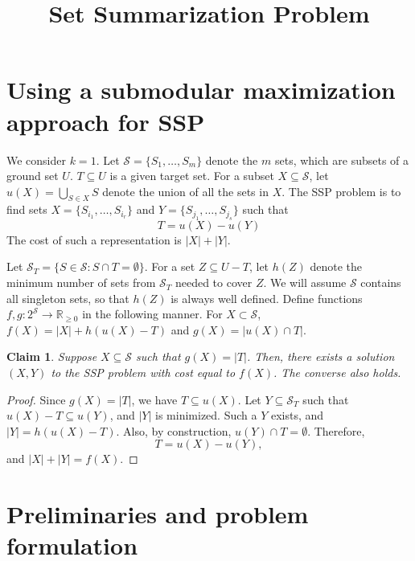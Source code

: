 \documentclass[twoside, leqno, twocolumn]{article}
\title{Set Summarization Problem}
\newtheorem{claim}[lemma]{Claim} %
\begin{document}
%










\section{Using a submodular maximization approach for SSP}
We consider $k=1$.
Let $\mathcal{S} = \{S_1,\ldots,S_m\}$ denote the $m$ sets, which are subsets of
a ground set $U$. $T\subseteq U$ is a given target set.  For a subset
$X\subseteq \mathcal{S}$, let $u(X)=\bigcup_{S\in X} S$ denote the union of all the
sets in $X$.  The SSP problem is to
find sets $X=\{S_{i_1},\ldots,S_{i_r}\}$ and $Y=\{S_{j_1},\ldots,S_{j_s}\}$ such that
\[
T= u(X) - u(Y)
\]
The cost of such a representation is $|X|+|Y|$.

Let $\mathcal{S}_T=\{S\in\mathcal{S}: S\cap T=\emptyset\}$.
For a set $Z\subseteq U-T$, let $h(Z)$ denote the minimum number of sets from $\mathcal{S}_T$
needed to cover $Z$. We will assume $\mathcal{S}$ contains all singleton sets, so that
$h(Z)$ is always well defined.
Define functions $f,g:2^{\mathcal{S}}\rightarrow \mathbb{R}_{\geq 0}$ in the following manner.
For $X\subset \mathcal{S}$, $f(X)=|X| + h(u(X)-T)$ and $g(X)=|u(X)\cap T|$.

\begin{claim}
Suppose $X\subseteq\mathcal{S}$ such that $g(X)=|T|$. Then, there exists a solution $(X, Y)$
to the SSP problem with cost equal to $f(X)$. The converse also holds.
\end{claim}
\begin{proof}
Since $g(X)=|T|$, we have $T\subseteq u(X)$. Let $Y\subseteq \mathcal{S}_T$
such that $u(X)-T \subseteq u(Y)$, and $|Y|$ is minimized.
Such a $Y$ exists, and $|Y|=h(u(X)-T)$. Also, by construction, $u(Y)\cap T=\emptyset$.
Therefore,
\[
T = u(X) - u(Y),
\]
and $|X|+|Y| = f(X)$.
\end{proof}

\section{Preliminaries and problem formulation}
\end{document}
